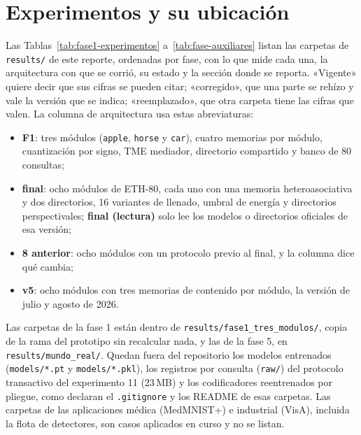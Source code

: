 \chapter{Experimentos y su ubicación}\label{apendiceA}

Las Tablas~\ref{tab:fase1-experimentos} a~\ref{tab:fase-auxiliares} listan las carpetas
de \texttt{results/} de este reporte, ordenadas por fase, con lo que mide cada una, la
arquitectura con que se corrió, su estado y la sección donde se reporta.
«Vigente» quiere decir que sus cifras se pueden citar; «corregido», que una parte se
rehízo y vale la versión que se indica; «reemplazado», que otra carpeta tiene las cifras
que valen.
La columna de arquitectura usa estas abreviaturas:
\begin{itemize}
    \item \textbf{F1}: tres módulos (\texttt{apple}, \texttt{horse} y \texttt{car}), cuatro
    memorias por módulo, cuantización por signo, TME mediador, directorio compartido y
    banco de 80 consultas;
    \item \textbf{final}: ocho módulos de ETH-80, cada uno con una memoria
    heteroasociativa y dos directorios, 16 variantes de llenado, umbral de energía y
    directorios perspectivales; \textbf{final (lectura)} solo lee los modelos o
    directorios oficiales de esa versión;
    \item \textbf{8 anterior}: ocho módulos con un protocolo previo al final, y la columna
    dice qué cambia;
    \item \textbf{v5}: ocho módulos con tres memorias de contenido por módulo, la versión
    de julio y agosto de 2026.
\end{itemize}

Las carpetas de la fase 1 están dentro de \texttt{results/fase1\_tres\_modulos/}, copia
de la rama del prototipo sin recalcular nada, y las de la fase 5, en
\texttt{results/mundo\_real/}.
Quedan fuera del repositorio los modelos entrenados (\texttt{models/*.pt} y
\texttt{models/*.pkl}), los registros por consulta (\texttt{raw/}) del protocolo
transactivo del experimento 11 (23\,MB) y los codificadores reentrenados por pliegue,
como declaran el \texttt{.gitignore} y los README de esas carpetas.
Las carpetas de las aplicaciones médica (MedMNIST+) e industrial (VisA), incluida la flota
de detectores, son casos aplicados en curso y no se listan.

